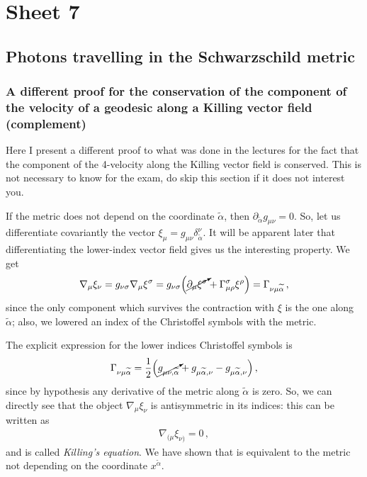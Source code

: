 \documentclass[main.tex]{subfiles}
\begin{document}
\section{Sheet 7}

\subsection{Photons travelling in the Schwarzschild metric}

\subsubsection{A different proof for the conservation of the component of the velocity of a geodesic along a Killing vector field (complement)}

Here I present a different proof to what was done in the lectures for the fact that the component of the 4-velocity along the Killing vector field is conserved. 
This is not necessary to know for the exam, do skip this section if it does not interest you. 

If the metric does not depend on the coordinate \(\widetilde{\alpha }\), then \(\partial_{\widetilde{\alpha }} g_{\mu \nu } = 0\). So, let us differentiate covariantly the vector \(\xi_{\mu } = g_{\mu \nu } \delta^{\nu}_{\widetilde{\alpha }}\).
It will be apparent later that differentiating the lower-index vector field gives us the interesting property.
We get 
%
\begin{align}
  \nabla_{\mu } \xi_{\nu } =
  g_{\nu \sigma } \nabla_{\mu } \xi^{\sigma }
  =  g_{\nu \sigma }
  \qty(\cancelto{}{\partial_{\mu } \xi^{\sigma }} + \Gamma^{\sigma }_{\mu \rho } \xi^{\rho })
  = \Gamma_{\nu \mu \widetilde{\alpha }}
\,,
\end{align}
%
since the only component which survives the contraction with \(\xi \) is the one along \(\widetilde{\alpha} \); also, we lowered an index of the Christoffel symbols with the metric. 

The explicit expression for the lower indices Christoffel symbols is 
%
\begin{align}
  \Gamma_{\nu \mu \widetilde{\alpha }}
  = \frac{1}{2} \qty(\cancelto{}{g_{\mu \nu , \widetilde{\alpha }}} +
  g_{\mu \widetilde{\alpha }, \nu }
  - g_{\mu \widetilde{\alpha }, \nu })
\,,
\end{align}
%
since by hypothesis any derivative of the metric along \(\widetilde{\alpha}\) is zero. So, we can directly see that the object \(\nabla_{\mu } \xi_{\nu }\) is antisymmetric in its indices: this can be written as 
%
\begin{align}
  \nabla_{(\mu } \xi_{\nu )} = 0
\,,
\end{align}
%
and is called \emph{Killing's equation}. We have shown that is equivalent to the metric not depending on the coordinate \(x^{\widetilde{\alpha}}\).
\end{document}
